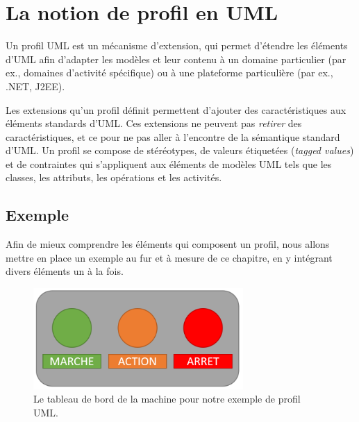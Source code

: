 \section{La notion de profil en UML}



Un profil UML est un m\'ecanisme d'extension, qui
permet d'étendre les éléments d'UML afin d'adapter les mod\`eles et leur contenu à un domaine particulier (par ex.,  domaines d'activité spécifique) ou \`a une plateforme particulière (par ex.,  .NET, J2EE).

Les extensions qu'un profil d\'efinit permettent d'ajouter des caractéristiques aux éléments standards d'UML.
Ces extensions ne peuvent pas \emph{retirer} des caractéristiques, et ce pour ne pas aller à l'encontre de la sémantique standard d'UML.
Un profil se compose  de stéréotypes, de valeurs \'etiquet\'ees (\emph{tagged values}) et de contraintes qui s'appliquent aux éléments de modèles UML tels que les classes, les attributs, les opérations et les activités.


\subsection*{Exemple}
%
Afin de mieux comprendre les éléments qui composent un profil, nous allons mettre en place un exemple au fur et à mesure de ce chapitre, en y intégrant divers éléments un \`a la fois.

\begin{figure}
    \centering
    \includegraphics[width=8cm]{10_img/chap4/example.PNG}
    \caption{Le tableau de bord de la machine pour notre exemple de profil UML.}
    \label{fig.uml_ex}
\end{figure}


